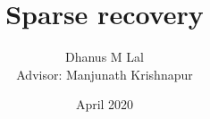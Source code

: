 \documentclass{article}
\title{Sparse recovery}
\author{Dhanus M Lal\\
\small{Advisor: Manjunath Krishnapur}}
\date{April 2020}
\begin{document}
	\maketitle



\begin{multicols}{2}	
	

	

	

	
\nocite{hdp, gp, chaining, compressiveSensing, tao1, tao2, candes-tao, fourier}


\end{multicols}
\end{document}
